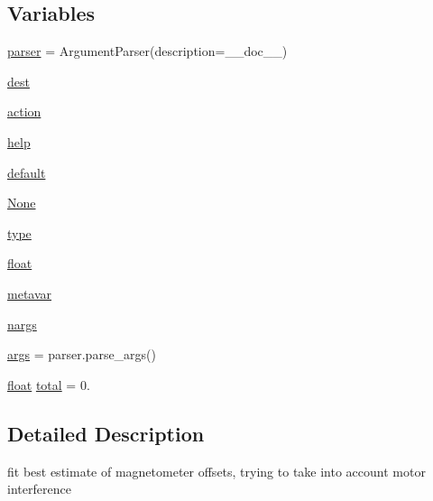 \subsection*{Variables}
\begin{DoxyCompactItemize}
\item 
\mbox{\hyperlink{namespacepymavlink_1_1tools_1_1magfit__motors_af14464509f99203a4b7a9d8d921e9e44}{parser}} = Argument\+Parser(description=\+\_\+\+\_\+doc\+\_\+\+\_\+)
\item 
\mbox{\hyperlink{namespacepymavlink_1_1tools_1_1magfit__motors_a98281994246dadaf6c0650facb414254}{dest}}
\item 
\mbox{\hyperlink{namespacepymavlink_1_1tools_1_1magfit__motors_a913c48c5ca0e3ab4afe744743e5d8a97}{action}}
\item 
\mbox{\hyperlink{namespacepymavlink_1_1tools_1_1magfit__motors_a26555be2425d9499fca7470a3e8b61b9}{help}}
\item 
\mbox{\hyperlink{namespacepymavlink_1_1tools_1_1magfit__motors_afbccfb7c9d8d3f32508f8ddc87a3b7c0}{default}}
\item 
\mbox{\hyperlink{namespacepymavlink_1_1tools_1_1magfit__motors_a799d3ced2a839245c04875d15154007c}{None}}
\item 
\mbox{\hyperlink{namespacepymavlink_1_1tools_1_1magfit__motors_a02f44d9e6b0605a85106254aa809f414}{type}}
\item 
\mbox{\hyperlink{namespacepymavlink_1_1tools_1_1magfit__motors_adacd10b5a5e5dcbda0ac78a5331dd855}{float}}
\item 
\mbox{\hyperlink{namespacepymavlink_1_1tools_1_1magfit__motors_a57935f8392a1c7e85ce53789def3d3f3}{metavar}}
\item 
\mbox{\hyperlink{namespacepymavlink_1_1tools_1_1magfit__motors_a2ac8e4039cfbd11b92b7a46d3384ebe4}{nargs}}
\item 
\mbox{\hyperlink{namespacepymavlink_1_1tools_1_1magfit__motors_a7700e9fef248605dc567389a42c901a3}{args}} = parser.\+parse\+\_\+args()
\item 
\mbox{\hyperlink{namespacepymavlink_1_1tools_1_1magfit__motors_adacd10b5a5e5dcbda0ac78a5331dd855}{float}} \mbox{\hyperlink{namespacepymavlink_1_1tools_1_1magfit__motors_a8290263a984c6842655820ea9f2437e6}{total}} = 0.
\end{DoxyCompactItemize}


\subsection{Detailed Description}
\begin{DoxyVerb}fit best estimate of magnetometer offsets, trying to take into account motor interference
\end{DoxyVerb}
 

